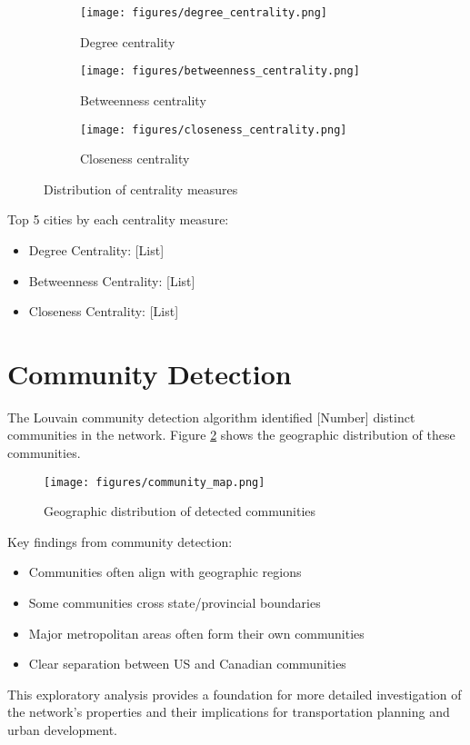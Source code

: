 \begin{figure}[H]
    \centering
    \begin{subfigure}[b]{0.32\textwidth}
        \texttt{[image: figures/degree\_centrality.png]}
        \caption{Degree centrality}
    \end{subfigure}
    \begin{subfigure}[b]{0.32\textwidth}
        \texttt{[image: figures/betweenness\_centrality.png]}
        \caption{Betweenness centrality}
    \end{subfigure}
    \begin{subfigure}[b]{0.32\textwidth}
        \texttt{[image: figures/closeness\_centrality.png]}
        \caption{Closeness centrality}
    \end{subfigure}
    \caption{Distribution of centrality measures}
    \label{fig:centrality}
\end{figure}

Top 5 cities by each centrality measure:
\begin{itemize}
    \item Degree Centrality: [List]
    \item Betweenness Centrality: [List]
    \item Closeness Centrality: [List]
\end{itemize}

\section{Community Detection}
The Louvain community detection algorithm identified [Number] distinct communities in the network. Figure \ref{fig:communities} shows the geographic distribution of these communities.

\begin{figure}[H]
    \centering
    \texttt{[image: figures/community\_map.png]}
    \caption{Geographic distribution of detected communities}
    \label{fig:communities}
\end{figure}

Key findings from community detection:
\begin{itemize}
    \item Communities often align with geographic regions
    \item Some communities cross state/provincial boundaries
    \item Major metropolitan areas often form their own communities
    \item Clear separation between US and Canadian communities
\end{itemize}

This exploratory analysis provides a foundation for more detailed investigation of the network's properties and their implications for transportation planning and urban development. 